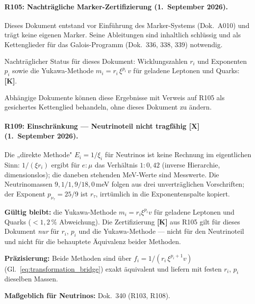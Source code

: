 \paragraph{R105: Nachträgliche Marker-Zertifizierung (1.~September 2026).}
Dieses Dokument entstand vor Einführung des Marker-Systems (Dok.~A010)
und trägt keine eigenen Marker. Seine Ableitungen sind inhaltlich schlüssig
und als Kettenglieder für das Galois-Programm (Dok.~336, 338, 339) notwendig.

Nachträglicher Status für dieses Dokument:
Wicklungszahlen $r_i$ und Exponenten $p_i$ sowie die Yukawa-Methode
$m_i = r_i\,\xi^{p_i}\,v$ für geladene Leptonen und Quarks: \textbf{[K]}.

Abhängige Dokumente können diese Ergebnisse mit Verweis auf R105 als gesichertes
Kettenglied behandeln, ohne dieses Dokument zu ändern.

\paragraph{R109: Einschränkung --- Neutrinoteil nicht tragfähig \textbf{[X]} (1.~September 2026).}
Die „direkte Methode" $E_i=1/\xi_i$ für Neutrinos ist keine Rechnung im
eigentlichen Sinn: $1/(\xi r_i)$ ergibt für $e:\mu$ das Verhältnis $1:0{,}42$
(inverse Hierarchie, dimensionslos); die daneben stehenden MeV-Werte sind Messwerte.
Die Neutrinomassen $9{,}1/1{,}9/18{,}0$\,meV folgen aus drei unverträglichen
Vorschriften; der Exponent $p_{\nu_\tau}=25/9$ ist $r_\tau$, irrtümlich in die
Exponentenspalte kopiert.

\textbf{Gültig bleibt:} die Yukawa-Methode $m_i=r_i\xi^{p_i}v$ für geladene
Leptonen und Quarks ($<1{,}2\,\%$ Abweichung). Die Zertifizierung \textbf{[K]} aus
R105 gilt für dieses Dokument \emph{nur} für $r_i$, $p_i$ und die Yukawa-Methode ---
nicht für den Neutrinoteil und nicht für die behauptete Äquivalenz beider Methoden.

\textbf{Präzisierung:} Beide Methoden sind über
$f_i=1/(r_i\,\xi^{p_i+1}v)$ (Gl.~\ref{eq:transformation_bridge}) exakt äquivalent und
liefern mit festen $r_i$, $p_i$ dieselben Massen.

\textbf{Maßgeblich für Neutrinos:} Dok.~340 (R103, R108).
